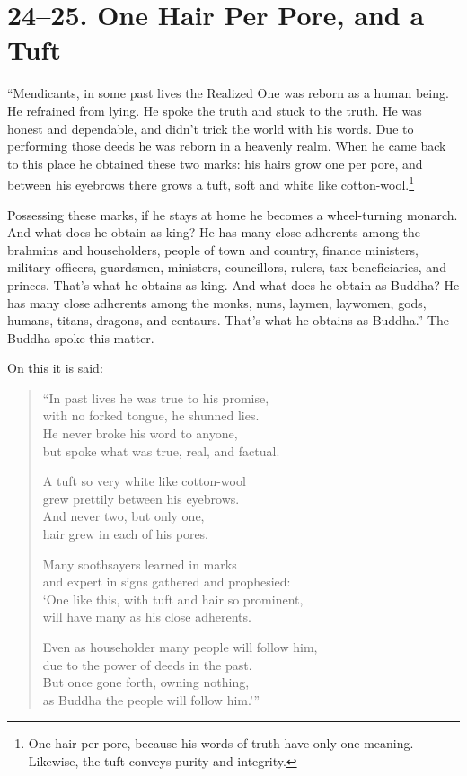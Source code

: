 \documentclass[12pt,openany]{book}%
\begin{document}
\section*{24–25. One Hair Per Pore, and a Tuft }

“Mendicants, in some past lives the Realized One was reborn as a human being. He refrained from lying. He spoke the truth and stuck to the truth. He was honest and dependable, and didn’t trick the world with his words. Due to performing those deeds he was reborn in a heavenly realm. When he came back to this place he obtained these two marks: his hairs grow one per pore, and between his eyebrows there grows a tuft, soft and white like cotton-wool.\footnote{One hair per pore, because his words of truth have only one meaning. Likewise, the tuft conveys purity and integrity. } 

Possessing these marks, if he stays at home he becomes a wheel-turning monarch. And what does he obtain as king? He has many close adherents among the brahmins and householders, people of town and country, finance ministers, military officers, guardsmen, ministers, councillors, rulers, tax beneficiaries, and princes. That’s what he obtains as king. And what does he obtain as Buddha? He has many close adherents among the monks, nuns, laymen, laywomen, gods, humans, titans, dragons, and centaurs. That’s what he obtains as Buddha.” The Buddha spoke this matter. 

On this it is said: 

\begin{verse}%
“In past lives he was true to his promise, \\
with no forked tongue, he shunned lies. \\
He never broke his word to anyone, \\
but spoke what was true, real, and factual. 

A tuft so very white like cotton-wool \\
grew prettily between his eyebrows. \\
And never two, but only one, \\
hair grew in each of his pores. 

Many soothsayers learned in marks \\
and expert in signs gathered and prophesied: \\
‘One like this, with tuft and hair so prominent, \\
will have many as his close adherents. 

Even as householder many people will follow him, \\
due to the power of deeds in the past. \\
But once gone forth, owning nothing, \\
as Buddha the people will follow him.’” 

%
\end{verse}
\end{document}
